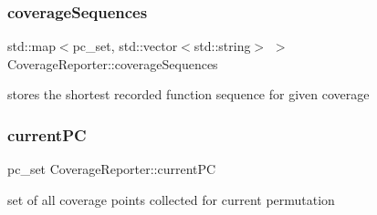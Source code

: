 \subsubsection{\texorpdfstring{coverage\+Sequences}{coverageSequences}}
{\footnotesize\ttfamily std\+::map$<$pc\+\_\+set, std\+::vector$<$std\+::string$>$ $>$ Coverage\+Reporter\+::coverage\+Sequences}

stores the shortest recorded function sequence for given coverage \mbox{\label{classCoverageReporter_a731717e0ad503323a0b541b8c1497080}} 
\subsubsection{\texorpdfstring{current\+PC}{currentPC}}
{\footnotesize\ttfamily pc\+\_\+set Coverage\+Reporter\+::current\+PC}

set of all coverage points collected for current permutation 